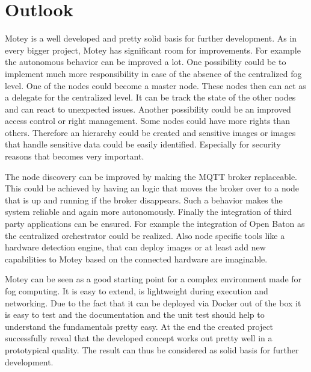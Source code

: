 




\section{Outlook}
Motey is a well developed and pretty solid basis for further development.
As in every bigger project, Motey has significant room for improvements.
For example the autonomous behavior can be improved a lot.
One possibility could be to implement much more responsibility in case of the absence of the centralized fog level.
One of the nodes could become a master node.
These nodes then can act as a delegate for the centralized level.
It can be track the state of the other nodes and can react to unexpected issues.
Another possibility could be an improved access control or right management.
Some nodes could have more rights than others.
Therefore an hierarchy could be created and sensitive images or images that handle sensitive data could be easily identified.
Especially for security reasons that becomes very important.\newline

The node discovery can be improved by making the \ac{MQTT} broker replaceable.
This could be achieved by having an logic that moves the broker over to a node that is up and running if the broker disappears.
Such a behavior makes the system reliable and again more autonomously.
Finally the integration of third party applications can be ensured.
For example the integration of Open Baton as the centralized orchestrator could be realized.
Also node specific tools like a hardware detection engine, that can deploy images or at least add new capabilities to Motey based on the connected hardware are imaginable.\newline

Motey can be seen as a good starting point for a complex environment made for fog computing.
It is easy to extend, is lightweight during execution and networking.
Due to the fact that it can be deployed via Docker out of the box it is easy to test and the documentation and the unit test should help to understand the fundamentals pretty easy.
At the end the created project successfully reveal that the developed concept works out pretty well in a prototypical quality.
The result can thus be considered as solid basis for further development.
